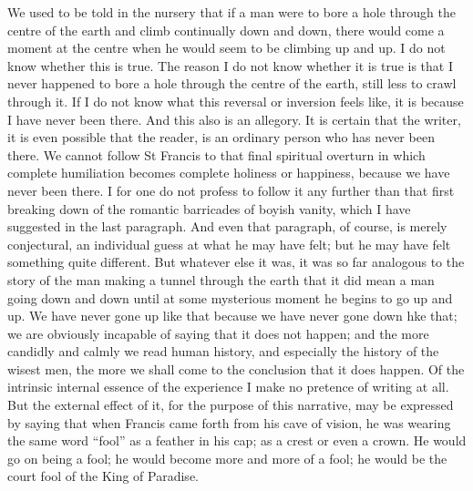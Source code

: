 \documentclass{book}
\begin{document}
We used to be told in the nursery that if a man were to bore a hole through the centre of the earth and climb continually down and down, there would come a moment at the centre when he would seem to be climbing up and up. I do not know whether this is true. The reason I do not know whether it is true is that I never happened to bore a hole through the centre of the earth, still less to crawl through it. If I do not know what this reversal or inversion feels like, it is because I have never been there. And this also is an allegory. It is certain that the writer, it is even possible that the reader, is an ordinary person who has never been there. We cannot follow St Francis to that final spiritual overturn in which complete humiliation becomes complete holiness or happiness, because we have never been there. I for one do not profess to follow it any further than that first breaking down of the romantic barricades of boyish vanity, which I have suggested in the last paragraph. And even that paragraph, of course, is merely conjectural, an individual guess at what he may have felt; but he may have felt something quite different. But whatever else it was, it was so far analogous to the story of the man making a tunnel through the earth that it did mean a man going down and down until at some mysterious moment he begins to go up and up. We have never gone up like that because we have never gone down hke that; we are obviously incapable of saying that it does not happen; and the more candidly and calmly we read human history, and especially the history of the wisest men, the more we shall come to the conclusion that it does happen. Of the intrinsic internal essence of the experience I make no pretence of writing at all. But the external effect of it, for the purpose of this narrative, may be expressed by saying that when Francis came forth from his cave of vision, he was wearing the same word “fool” as a feather in his cap; as a crest or even a crown. He would go on being a fool; he would become more and more of a fool; he would be the court fool of the King of Paradise.
\end{document}
